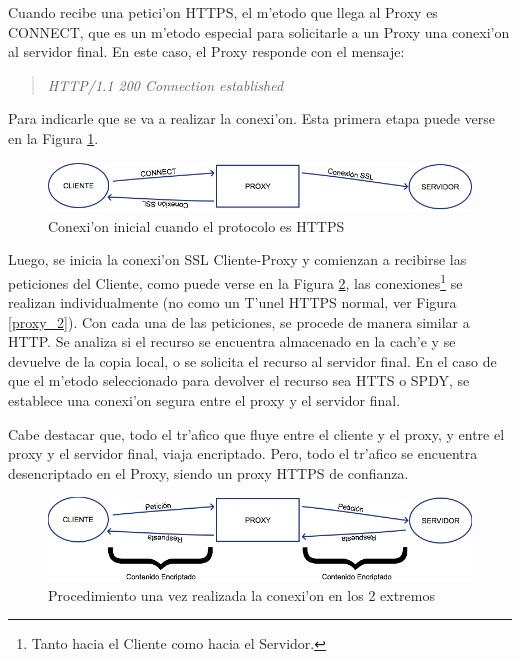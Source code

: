 Cuando recibe una petici'on HTTPS, el m'etodo que llega al Proxy es CONNECT, que es un m'etodo especial para solicitarle a un Proxy una conexi'on al servidor final. En este caso, el Proxy responde con el mensaje:
\begin{quote}
\textit{\textit{HTTP/1.1 200 Connection established}}
\end{quote}
Para indicarle que se va a realizar la conexi'on. Esta primera etapa puede verse en la Figura \ref{mitm1}.

\begin{figure}[h]
  	\centering
	\includegraphics[width=\textwidth]{img/mitm1}
	\caption{\small Conexi'on inicial cuando el protocolo es HTTPS}
	\label{mitm1}
\end{figure}

Luego, se inicia la conexi'on SSL Cliente-Proxy y comienzan a recibirse las peticiones del Cliente, como puede verse en la Figura \ref{mitm2}, las conexiones\footnote{Tanto hacia el Cliente como hacia el Servidor.} se realizan individualmente (no como un T'unel HTTPS normal, ver Figura \ref{proxy_2}). Con cada una de las peticiones, se procede de manera similar a HTTP. Se analiza si el recurso se encuentra almacenado en la cach'e y se devuelve de la copia local, o se solicita el recurso al servidor final. En el caso de que el m'etodo seleccionado para devolver el recurso sea HTTS o SPDY, se establece una conexi'on segura entre el proxy y el servidor final.

Cabe destacar que, todo el tr'afico que fluye entre el cliente y el proxy, y entre el proxy y el servidor final, viaja encriptado. Pero, todo el tr'afico se encuentra desencriptado en el Proxy, siendo un proxy HTTPS de confianza.

\begin{figure}[h]
  	\centering
	\includegraphics[width=\textwidth]{img/mitm2}
	\caption{\small Procedimiento una vez realizada la conexi'on en los 2 extremos}
	\label{mitm2}
\end{figure}

